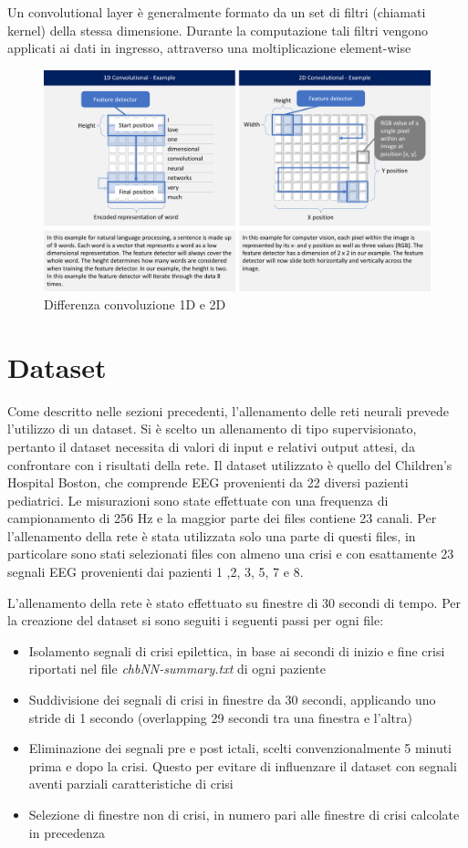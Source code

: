 \documentclass{article}
\begin{document}
Un convolutional layer è generalmente formato da un set di filtri (chiamati kernel) della stessa dimensione. Durante la computazione tali filtri vengono applicati ai dati in ingresso, attraverso una moltiplicazione element-wise
\begin{figure}[!h]
\centering
\includegraphics[scale=0.2]{conv1d}
\caption{Differenza convoluzione 1D e 2D}
\end{figure}

\section{Dataset}
Come descritto nelle sezioni precedenti, l'allenamento delle reti neurali prevede l'utilizzo di un dataset. Si è scelto un allenamento di tipo supervisionato, pertanto il dataset necessita di valori di input e relativi output attesi, da confrontare con i risultati della rete. Il dataset utilizzato è quello del Children's Hospital Boston, che comprende EEG provenienti da 22 diversi pazienti pediatrici. Le misurazioni sono state effettuate con una frequenza di campionamento di 256 Hz e la maggior parte dei files contiene 23 canali. Per l'allenamento della rete è stata utilizzata solo una parte di questi files, in particolare sono stati selezionati files con almeno una crisi e con esattamente 23 segnali EEG provenienti dai pazienti 1 ,2, 3, 5, 7 e 8.

L'allenamento della rete è stato effettuato su finestre di 30 secondi di tempo. Per la creazione del dataset si sono seguiti i seguenti passi per ogni file:
\begin{itemize}
\item Isolamento segnali di crisi epilettica, in base ai secondi di inizio e fine crisi riportati nel file \textit{chbNN-summary.txt} di ogni paziente
\item Suddivisione dei segnali di crisi in finestre da 30 secondi, applicando uno stride di 1 secondo (overlapping 29 secondi tra una finestra e l'altra)
\item Eliminazione dei segnali pre e post ictali, scelti convenzionalmente 5 minuti prima e dopo la crisi. Questo per evitare di influenzare il dataset con segnali aventi parziali caratteristiche di crisi
\item Selezione di finestre non di crisi, in numero pari alle finestre di crisi calcolate in precedenza
\end{itemize}
\end{document}
